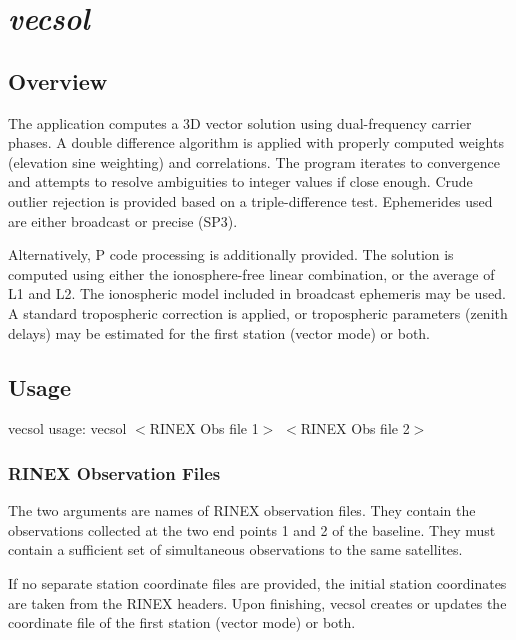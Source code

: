 %
%


\section{\emph{vecsol}}
\subsection{Overview}
The application computes a 3D vector solution using dual-frequency carrier phases. A double difference
algorithm is applied with properly computed weights (elevation sine weighting) and correlations. The program
iterates to convergence and attempts to resolve ambiguities to integer values if close enough. Crude outlier rejection
is provided based on a triple-difference test. Ephemerides used are either broadcast or precise (SP3). 

Alternatively, P code processing is additionally provided.
The solution is computed using either the ionosphere-free linear
combination, or the average of L1 and L2. The ionospheric model included
in broadcast ephemeris may be used. A standard tropospheric correction
is applied, or tropospheric parameters (zenith delays) may be estimated
for the first station (vector mode) or both.

\subsection{Usage}
\begin{\outputsize}
vecsol usage: vecsol $<$RINEX Obs file 1$>$ $<$RINEX Obs file 2$>$
\end{\outputsize}

\subsubsection{RINEX Observation Files}
The two arguments are names of RINEX observation files. They contain the observations collected at the two end points 1 and 2 of the baseline.
They must contain a sufficient set of simultaneous observations to the same satellites.

If no separate station coordinate files are provided, the initial
station coordinates are taken from the RINEX headers. Upon finishing,
vecsol creates or updates the coordinate file of the first station
(vector mode) or both.

